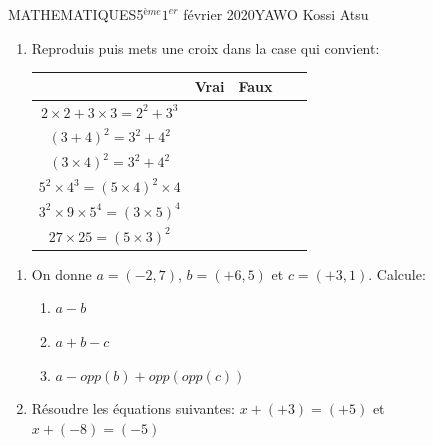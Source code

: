 \documentclass[12pt,a4paper]{book}
\newcommand{\prof}{YAWO Kossi Atsu}
\newcommand{\matiere}{MATHEMATIQUES}
\newcommand{\classe}{5$^{ème}$}
\begin{document}
\begin{td}{\matiere}{\classe}{$1^{er}$ février 2020}{\prof}
\begin{exo}
\begin{enumerate}
\item Reproduis puis mets une croix dans la case qui convient:\\
\begin{tabular}{|c|c|c|c|c|}
\hline 
 & Vrai & Faux\\ 
\hline 
$2\times 2+3\times 3=2^2+3^3$ &  & \\ 
\hline 
$(3+4)^2=3^2+4^2$ &  & \\ 
\hline
$(3\times 4)^2=3^2+4^2$ &  & \\ 
\hline
$5^2\times 4^3=(5\times 4)^2\times 4$ &  & \\ 
\hline
$3^2\times 9\times 5^4=(3\times 5)^4$ &  & \\ 
\hline
$27 \times 25=(5\times 3)^2$ &  & \\ 
\hline
\end{tabular} 
\end{enumerate}
\end{exo}

\begin{exo}
\begin{enumerate}
\item On donne $a=(-2,7)$, $b=(+6,5)$ et $c=(+3,1)$. Calcule:
\begin{enumerate}
\item $a-b$
\item $a+b-c$
\item $a-opp(b)+opp(opp(c))$
\end{enumerate}
\item Résoudre les équations suivantes:
$x+(+3)=(+5)$ \qquad et \qquad $ x+(-8)=(-5)$
\end{enumerate}
\end{exo}

\end{td}
\end{document}
